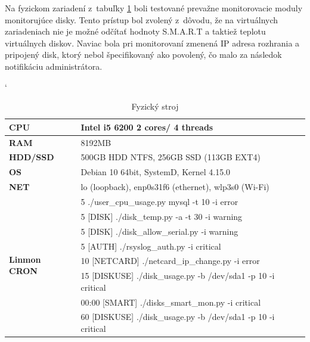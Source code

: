 Na fyzickom zariadení z~tabuľky \ref{phys_dev} boli testované prevažne monitorovacie moduly monitorujúce disky. Tento prístup bol zvolený z~dôvodu, že na virtuálnych zariadeniach nie je možné odčítať hodnoty S.M.A.R.T a taktiež teplotu virtuálnych diskov. Naviac bola pri monitorovaní zmenená IP adresa rozhrania a pripojený disk, ktorý nebol špecifikovaný ako povolený, čo malo za následok notifikáciu administrátora.
\\ 
\begin{table}[H]
	\catcode`
	\begin{center}
		\begin{tabular}{|l|l|}
			\hline
			\textbf{CPU} & Intel i5 6200 2 cores/ 4 threads  \\
			\hline
			\textbf{RAM} & 8192MB  \\
			\hline
			\textbf{HDD/SSD} & 500GB HDD NTFS, 256GB SSD (113GB EXT4) \\
			\hline
			\textbf{OS} & Debian 10 64bit, SystemD, Kernel 4.15.0 \\
			\hline
			\textbf{NET}& lo (loopback), enp0s31f6 (ethernet), wlp3s0 (Wi-Fi)\\
			\hline
			\multirow{8}{*}{\textbf{Linmon CRON}}  & 5 ./user\_cpu\_usage.py mysql -t 10 -i error\\
			& 5 [DISK] ./disk\_temp.py -a -t 30 -i warning\\
			& 5 [DISK] ./disk\_allow\_serial.py -i warning\\
			& 5 [AUTH] ./rsyslog\_auth.py -i critical\\
			& 10 [NETCARD] ./netcard\_ip\_change.py -i error\\
			& 15 [DISKUSE] ./disk\_usage.py -b /dev/sda1 -p 10 -i critical\\
			& 00:00 [SMART] ./disks\_smart\_mon.py -i critical\\
			& 60 [DISKUSE] ./disk\_usage.py -b /dev/sda1 -p 10 -i critical\\
			\hline			
		\end{tabular}
		\caption{Fyzický stroj}
		\label{phys_dev}
	\end{center}
\end{table}

